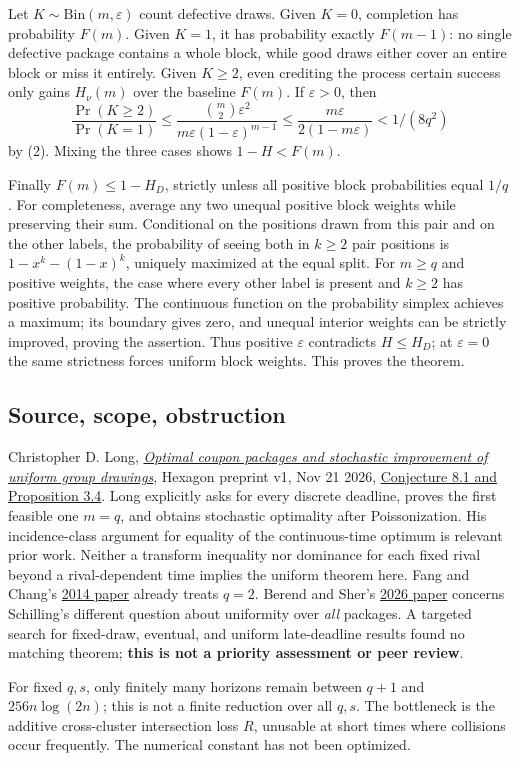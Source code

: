 \documentclass[10pt]{article}
\begin{document}
Let \(K\sim\mathrm{Bin}(m,\varepsilon)\) count defective draws. Given
\(K=0\), completion has probability \(F(m)\). Given \(K=1\), it has
probability exactly \(F(m-1)\): no single defective package contains a
whole block, while good draws either cover an entire block or miss it
entirely. Given \(K\ge2\), even crediting the process certain success
only gains \(H_\nu(m)\) over the baseline \(F(m)\). If
\(\varepsilon>0\), then \[
\frac{\Pr(K\ge2)}{\Pr(K=1)}
\le \frac{\binom m2\varepsilon^2}{m\varepsilon(1-\varepsilon)^{m-1}}
\le\frac{m\varepsilon}{2(1-m\varepsilon)}
<1/(8q^2)
\] by (2). Mixing the three cases shows \(1-H<F(m)\).

Finally \(F(m)\le1-H_D\), strictly unless all positive block
probabilities equal \(1/q\). For completeness, average any two unequal
positive block weights while preserving their sum. Conditional on the
positions drawn from this pair and on the other labels, the probability
of seeing both in \(k\ge2\) pair positions is \(1-x^k-(1-x)^k\),
uniquely maximized at the equal split. For \(m\ge q\) and positive
weights, the case where every other label is present and \(k\ge2\) has
positive probability. The continuous function on the probability simplex
achieves a maximum; its boundary gives zero, and unequal interior
weights can be strictly improved, proving the assertion. Thus positive
\(\varepsilon\) contradicts \(H\le H_D\); at \(\varepsilon=0\) the same
strictness forces uniform block weights. This proves the theorem.

\subsection*{Source, scope,
obstruction}\label{source-scope-obstruction}

Christopher D. Long,
\href{https://hexagonmath.org/2611.00814v1}{\emph{Optimal coupon
packages and stochastic improvement of uniform group drawings}}, Hexagon
preprint v1, Nov 21 2026,
\href{https://hexagonmath.org/pdf/2611.00814v1}{Conjecture 8.1 and
Proposition 3.4}. Long explicitly asks for every discrete deadline,
proves the first feasible one \(m=q\), and obtains stochastic optimality
after Poissonization. His incidence-class argument for equality of the
continuous-time optimum is relevant prior work. Neither a transform
inequality nor dominance for each fixed rival beyond a rival-dependent
time implies the uniform theorem here. Fang and Chang's
\href{https://doi.org/10.1016/j.ipl.2014.06.012}{2014 paper} already
treats \(q=2\). Berend and Sher's
\href{https://doi.org/10.1080/15326349.2026.2671340}{2026 paper}
concerns Schilling's different question about uniformity over \emph{all}
packages. A targeted search for fixed-draw, eventual, and uniform
late-deadline results found no matching theorem; \textbf{this is not a
priority assessment or peer review}.

For fixed \(q,s\), only finitely many horizons remain between \(q+1\)
and \(256n\log(2n)\); this is not a finite reduction over all \(q,s\).
The bottleneck is the additive cross-cluster intersection loss \(R\),
unusable at short times where collisions occur frequently. The numerical
constant has not been optimized.
\end{document}
